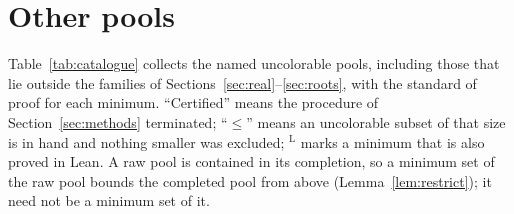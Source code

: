 \section{Other pools}\label{sec:catalogue}

Table~\ref{tab:catalogue} collects the named uncolorable pools, including those that lie outside
the families of Sections~\ref{sec:real}--\ref{sec:roots}, with the standard of proof for each
minimum.  ``Certified'' means the procedure of Section~\ref{sec:methods} terminated;
``$\le$'' means an uncolorable subset of that size is in hand and nothing smaller was excluded;
$^{\mathrm L}$ marks a minimum that is also proved in Lean.  A raw pool is contained in its
completion, so a minimum set of the raw pool bounds the completed pool from above
(Lemma~\ref{lem:restrict}); it need not be a minimum set of it.

